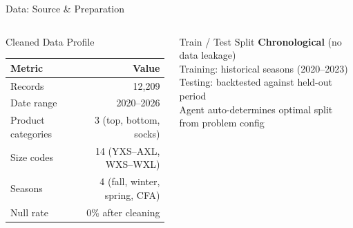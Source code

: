\documentclass[aspectratio=169, 9pt]{beamer}
\begin{document}
\begin{frame}{Data: Source \& Preparation}
\begin{columns}[T]
\begin{block}{Cleaned Data Profile}
\centering\scriptsize
\begin{tabular}{@{}l r@{}}
\toprule
\textbf{Metric} & \textbf{Value} \\
\midrule
Records         & 12,209 \\
Date range      & 2020--2026 \\
Product categories & 3 (top, bottom, socks) \\
Size codes      & 14 (YXS--AXL, WXS--WXL) \\
Seasons         & 4 (fall, winter, spring, CFA) \\
Null rate       & 0\% after cleaning \\
\bottomrule
\end{tabular}
\end{block}

\vspace{3pt}
\begin{block}{Train / Test Split}
\scriptsize
\textbf{Chronological} (no data leakage)\\[2pt]
Training: historical seasons (2020--2023)\\
Testing: backtested against held-out period\\[2pt]
{\tiny Agent auto-determines optimal split from problem config}
\end{block}
\end{columns}
\end{frame}
\end{document}
